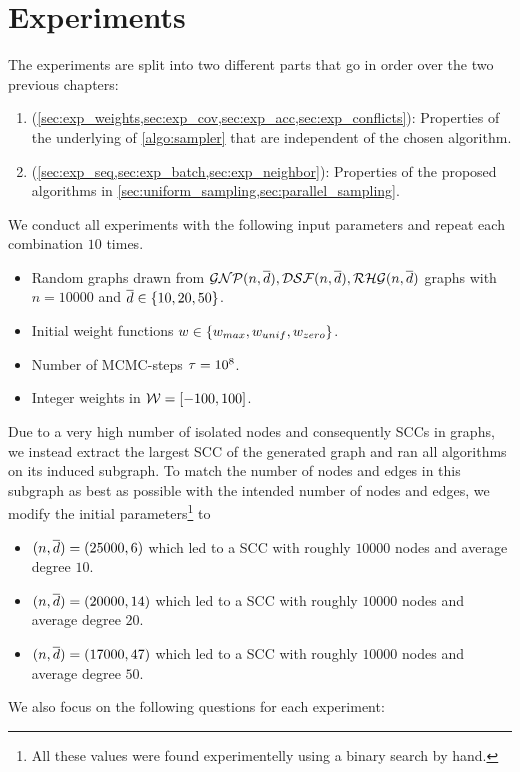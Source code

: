 \chapter{Experiments}\label{sec:experiments}
The experiments are split into two different parts that go in order over the two previous chapters:
\begin{enumerate}
  \item (\cref{sec:exp_weights,sec:exp_cov,sec:exp_acc,sec:exp_conflicts}): Properties of the underlying \markov of \cref{algo:sampler} that are independent of the chosen algorithm.
  \item (\cref{sec:exp_seq,sec:exp_batch,sec:exp_neighbor}): Properties of the proposed algorithms in \cref{sec:uniform_sampling,sec:parallel_sampling}.
\end{enumerate}
We conduct all experiments with the following input parameters and repeat each combination $10$ times.
\begin{itemize}
  \item Random graphs drawn from $\mathcal{GNP}(n,\overline{d}), \mathcal{DSF}(n,\overline{d}), \mathcal{RHG}(n,\overline{d})$ graphs with $n = 10000$ and $\overline{d} \in \left\{10, 20, 50\right\}$.
  \item Initial weight functions $w \in \left\{w_{max}, w_{unif}, w_{zero}\right\}$.
  \item Number of MCMC-steps $\tau = 10^8$.
  \item Integer weights in $\mathcal W = [-100,100]$.
\end{itemize}
Due to a very high number of isolated nodes and consequently SCCs in \dsf graphs, we instead extract the largest SCC of the generated \dsf graph and ran all algorithms on its induced subgraph.
To match the number of nodes and edges in this subgraph as best as possible with the intended number of nodes and edges, we modify the initial parameters\footnote{
  All these values were found experimentelly using a binary search by hand. 
} to 
\begin{itemize}
  \item $(n, \overline{d}) = (25000, 6)$ which led to a SCC with roughly $10000$ nodes and average degree $10$.
  \item $(n, \overline{d}) = (20000, 14)$ which led to a SCC with roughly $10000$ nodes and average degree $20$.
  \item $(n, \overline{d}) = (17000, 47)$ which led to a SCC with roughly $10000$ nodes and average degree $50$.
\end{itemize}

We also focus on the following questions for each experiment:


